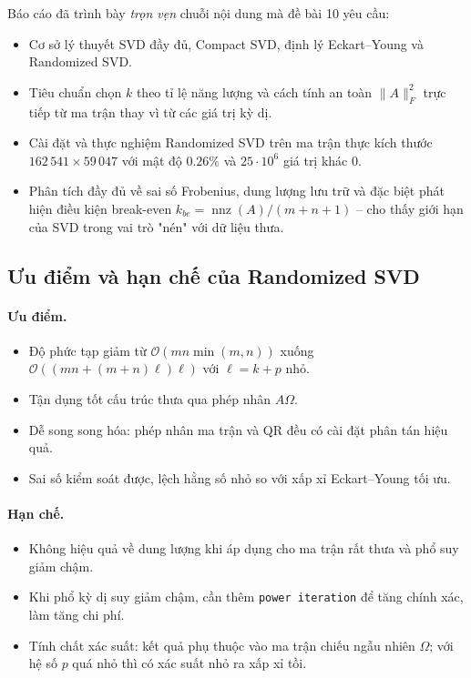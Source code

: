 Báo cáo đã trình bày \emph{trọn vẹn} chuỗi nội dung mà đề bài 10 yêu cầu:
\begin{itemize}
    \item Cơ sở lý thuyết SVD đầy đủ, Compact SVD, định lý Eckart--Young và
    Randomized SVD.
    \item Tiêu chuẩn chọn $k$ theo tỉ lệ năng lượng và cách tính an toàn
    $\|A\|_F^2$ trực tiếp từ ma trận thay vì từ các giá trị kỳ dị.
    \item Cài đặt và thực nghiệm Randomized SVD trên ma trận thực kích thước
    $162\,541 \times 59\,047$ với mật độ $0.26\%$ và $25\cdot 10^6$ giá trị
    khác $0$.
    \item Phân tích đầy đủ về sai số Frobenius, dung lượng lưu trữ và đặc biệt
    phát hiện điều kiện break-even $k_{be} = \operatorname{nnz}(A)/(m+n+1)$
    -- cho thấy giới hạn của SVD trong vai trò "nén" với dữ liệu thưa.
\end{itemize}

\subsection{Ưu điểm và hạn chế của Randomized SVD}

\paragraph{Ưu điểm.}
\begin{itemize}
    \item Độ phức tạp giảm từ $\mathcal{O}(mn\min(m,n))$ xuống
    $\mathcal{O}((mn + (m+n)\ell)\ell)$ với $\ell = k+p$ nhỏ.
    \item Tận dụng tốt cấu trúc thưa qua phép nhân $A\Omega$.
    \item Dễ song song hóa: phép nhân ma trận và QR đều có cài đặt phân tán
    hiệu quả.
    \item Sai số kiểm soát được, lệch hằng số nhỏ so với xấp xỉ Eckart--Young
    tối ưu.
\end{itemize}

\paragraph{Hạn chế.}
\begin{itemize}
    \item Không hiệu quả về dung lượng khi áp dụng cho ma trận rất thưa và phổ
    suy giảm chậm.
    \item Khi phổ kỳ dị suy giảm chậm, cần thêm \texttt{power iteration} để
    tăng chính xác, làm tăng chi phí.
    \item Tính chất xác suất: kết quả phụ thuộc vào ma trận chiếu ngẫu nhiên
    $\Omega$; với hệ số $p$ quá nhỏ thì có xác suất nhỏ ra xấp xỉ tồi.
\end{itemize}

